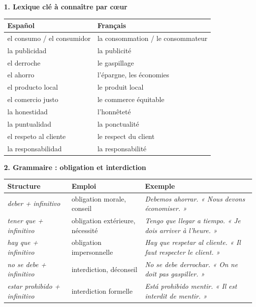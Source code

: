 \documentclass[11pt]{article}
\newcommand{\esp}[1]{\ifmmode\text{\textit{#1}}\else\begingroup\selectlanguage{spanish}\itshape #1\endgroup\fi}
\begin{document}
\begin{bilan}
\textbf{1. Lexique clé à connaître par cœur}

\begin{center}
\begin{tabularx}{\linewidth}{|X|X|}
\hline
\rowcolor{popblueL} \textbf{Español} & \textbf{Français} \\
\hline
el consumo / el consumidor & la consommation / le consommateur \\
\hline
la publicidad & la publicité \\
\hline
el derroche & le gaspillage \\
\hline
el ahorro & l'épargne, les économies \\
\hline
el producto local & le produit local \\
\hline
el comercio justo & le commerce équitable \\
\hline
la honestidad & l'honnêteté \\
\hline
la puntualidad & la ponctualité \\
\hline
el respeto al cliente & le respect du client \\
\hline
la responsabilidad & la responsabilité \\
\hline
\end{tabularx}
\end{center}

\textbf{2. Grammaire : obligation et interdiction}

\begin{center}
\begin{tabularx}{\linewidth}{|X|X|X|}
\hline
\rowcolor{popgreenL} \textbf{Structure} & \textbf{Emploi} & \textbf{Exemple} \\
\hline
\esp{deber + infinitivo} & obligation morale, conseil & \esp{Debemos ahorrar.} « Nous devons économiser. » \\
\hline
\esp{tener que + infinitivo} & obligation extérieure, nécessité & \esp{Tengo que llegar a tiempo.} « Je dois arriver à l'heure. » \\
\hline
\esp{hay que + infinitivo} & obligation impersonnelle & \esp{Hay que respetar al cliente.} « Il faut respecter le client. » \\
\hline
\esp{no se debe + infinitivo} & interdiction, déconseil & \esp{No se debe derrochar.} « On ne doit pas gaspiller. » \\
\hline
\esp{estar prohibido + infinitivo} & interdiction formelle & \esp{Está prohibido mentir.} « Il est interdit de mentir. » \\
\hline
\end{tabularx}
\end{center}


\end{bilan}
\end{document}
